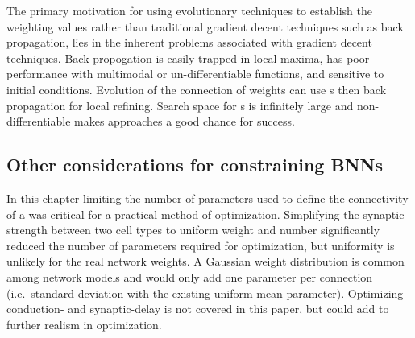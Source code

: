 The primary motivation for using evolutionary techniques to establish the
weighting values rather than traditional gradient decent techniques such as
back propagation, lies in the inherent problems associated with gradient
decent techniques. Back-propogation is easily trapped in local maxima, has
poor performance with multimodal or un-differentiable functions, and
sensitive to initial conditions. Evolution of the connection of weights can
use {\GA}s then back propagation for local refining. Search space for {\BNN}s
is infinitely large and non-differentiable makes {\GA} approaches a good
chance for success.




\subsection{Other considerations for constraining {BNN}s}\label{sec:GA:other-considerations}

In this chapter limiting the number of parameters used to define the
connectivity of a {\BNN} was critical for a practical method of
optimization. Simplifying the synaptic strength between two cell types to
uniform weight and number significantly reduced the number of parameters
required for optimization, but uniformity is unlikely for the real network
weights.  A Gaussian weight distribution is common among network models and
would only add one parameter per connection (i.e.\ standard deviation with
the existing uniform mean parameter).  Optimizing conduction- and
synaptic-delay is not covered in this paper, but could add to further
realism in {\BNN} optimization.

\smallskip{}

